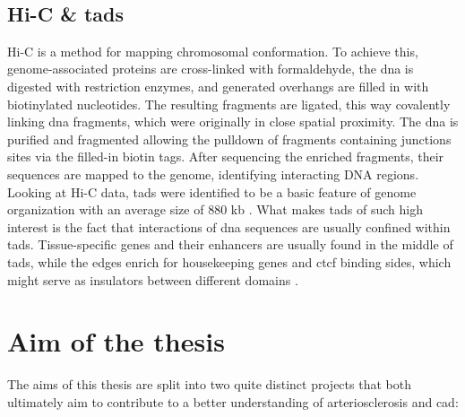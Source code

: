     \subsection{Hi-C \& \acsp{tad}}
    Hi-C is a method for mapping chromosomal conformation. To achieve this, genome-associated proteins are cross-linked with formaldehyde, the \ac{dna} is digested with restriction enzymes, and generated overhangs are filled in with biotinylated nucleotides. The resulting fragments are ligated, this way covalently linking \ac{dna} fragments, which were originally in close spatial proximity. The \ac{dna} is purified and fragmented allowing the pulldown of fragments containing junctions sites via the filled-in biotin tags. After sequencing the enriched fragments, their sequences are mapped to the genome, identifying interacting DNA regions. \cite{lieberman-aidenComprehensiveMappingLongRange2009, witDecade3CTechnologies2012}\\
    Looking at Hi-C data, \acp{tad} were identified to be a basic feature of genome organization with an average size of 880 kb \cite{dixonTopologicalDomainsMammalian2012, wang3DGenomeBrowser2018}. What makes \acp{tad} of such high interest is the fact that interactions of \ac{dna} sequences are usually confined within \acp{tad}. Tissue-specific genes and their enhancers are usually found in the middle of \acp{tad}, while the edges enrich for housekeeping genes and \ac{ctcf} binding sides, which might serve as insulators between different domains \cite{pomboThreedimensionalGenomeArchitecture2015}.


\section{Aim of the thesis}
\label{sec:Aim}
The aims of this thesis are split into two quite distinct projects that both ultimately aim to contribute to a better understanding of arteriosclerosis and \ac{cad}:

